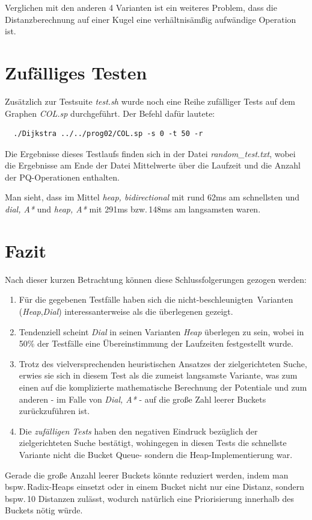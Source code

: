 \documentclass{scrartcl}
\begin{document}
Verglichen mit den anderen 4 Varianten ist ein weiteres Problem, dass die 
Distanzberechnung auf einer Kugel eine verhältnisämßig aufwändige Operation 
ist.

\section{Zufälliges Testen}

Zusätzlich zur Testsuite \emph{test.sh} wurde noch eine Reihe zufälliger
Tests auf dem Graphen \emph{COL.sp} durchgeführt.
Der Befehl dafür lautete:
\begin{verbatim}
  ./Dijkstra ../../prog02/COL.sp -s 0 -t 50 -r
\end{verbatim}
Die Ergebnisse dieses Testlaufs finden sich in der Datei \emph{random\_test.txt},
wobei die Ergebnisse am Ende der Datei Mittelwerte über die Laufzeit und
die Anzahl der PQ-Operationen enthalten.

Man sieht, dass im Mittel \emph{heap, bidirectional} mit rund 62ms am 
schnellsten und \emph{dial, A*} und \emph{heap, A*} mit 291ms bzw.\,148ms am
langsamsten waren.

\section{Fazit}

Nach dieser kurzen Betrachtung können diese Schlussfolgerungen gezogen werden:
\begin{enumerate}
  \item Für die gegebenen Testfälle haben sich die 
        \glqq nicht-beschleunigten\grqq\ Varianten 
        (\emph{Heap},\emph{Dial}) interessanterweise als die überlegenen
        gezeigt.
  \item Tendenziell scheint \emph{Dial} in seinen Varianten \emph{Heap}
        überlegen zu sein, wobei in 50\% der Testfälle eine Übereinstimmung der
        Laufzeiten festgestellt wurde.
  \item Trotz des vielversprechenden heuristischen Ansatzes der zielgerichteten
        Suche, erwies sie sich in diesem Test als die zumeist langsamste 
        Variante, was zum einen auf die komplizierte mathematische Berechnung
        der Potentiale und zum anderen - im Falle von \emph{Dial, A*} - 
        auf die große Zahl leerer Buckets zurückzuführen ist.
  \item Die \emph{zufälligen Tests} haben den negativen Eindruck bezüglich der
        zielgerichteten Suche bestätigt, wohingegen in diesen Tests die 
        schnellste Variante nicht die Bucket Queue- sondern die 
        Heap-Implementierung war.
\end{enumerate}

Gerade die große Anzahl leerer Buckets könnte reduziert werden, indem man
bspw.\,Radix-Heaps einsetzt oder in einem Bucket nicht nur eine Distanz,
sondern bspw.\,10 Distanzen zulässt, wodurch natürlich eine Priorisierung 
innerhalb des Buckets nötig würde.
\end{document}
